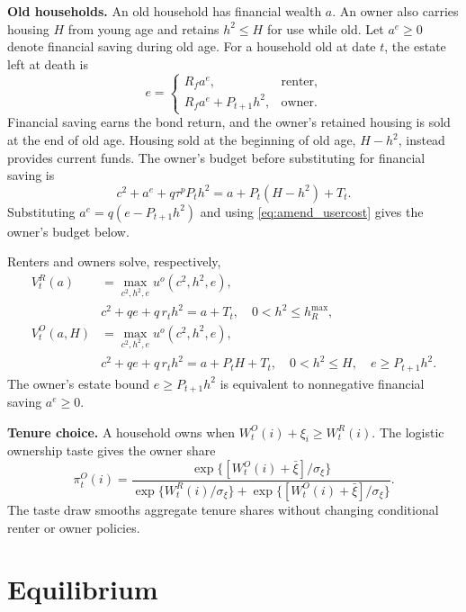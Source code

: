 \documentclass[11pt]{article}
\begin{document}
\textbf{Old households.}
An old household has financial wealth $a$. An owner also carries housing $H$
from young age and retains $h^2\leq H$ for use while old. Let $a^e\geq0$
denote financial saving during old age. For a household old at date $t$,
the estate left at death is
\begin{equation}
 e=\begin{cases}
 R_f a^e, & \text{renter},\\
 R_f a^e+P_{t+1}h^2, & \text{owner}.
 \end{cases}
 \label{eq:amend_estate_components}
\end{equation}
Financial saving earns the bond return, and the owner's retained housing
is sold at the end of old age. Housing sold at the beginning of old age,
$H-h^2$, instead provides current funds. The owner's budget before
substituting for financial saving is
\begin{equation}
 c^2+a^e+q\tau^pP_t h^2=a+P_t(H-h^2)+T_t.
 \label{eq:amend_old_cash_budget}
\end{equation}
Substituting $a^e=q(e-P_{t+1}h^2)$ and using
\eqref{eq:amend_usercost} gives the owner's budget below.
\par{}
Renters and owners solve, respectively,
\begin{align}
 V_t^R(a)&=\max_{c^2,h^2,e}u^o(c^2,h^2,e),\nonumber\\
 &c^2+qe+q\,r_th^2=a+T_t,\quad 0<h^2\leq h_R^{\max},
 \label{eq:amend_old_renter}\\
 V_t^O(a,H)&=\max_{c^2,h^2,e}u^o(c^2,h^2,e),\nonumber\\
 &c^2+qe+q\,r_th^2=a+P_tH+T_t,\quad
 0<h^2\leq H,\quad e\geq P_{t+1}h^2.
 \label{eq:amend_old_budget}
\end{align}
The owner's estate bound $e\geq P_{t+1}h^2$ is equivalent to
nonnegative financial saving $a^e\geq0$.

\textbf{Tenure choice.}
A household owns when $W_t^O(i)+\xi_i\geq W_t^R(i)$. The logistic ownership
taste gives the owner share
\begin{equation}
 \pi_t^O(i)=
 \frac{\exp\{[W_t^O(i)+\bar\xi]/\sigma_\xi\}}
 {\exp\{W_t^R(i)/\sigma_\xi\}+\exp\{[W_t^O(i)+\bar\xi]/\sigma_\xi\}}.
 \label{eq:amend_tenure}
\end{equation}
The taste draw smooths aggregate tenure shares without changing conditional
renter or owner policies.

\section{Equilibrium}
\end{document}
